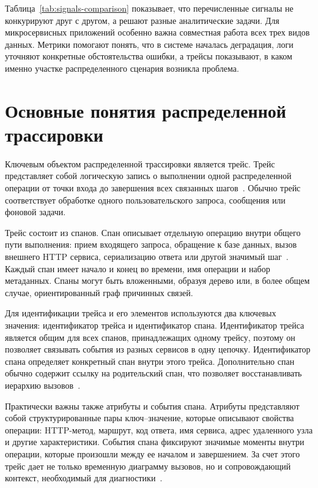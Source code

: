 Таблица~\ref{tab:signals-comparison} показывает, что перечисленные сигналы не
конкурируют друг с другом, а решают разные аналитические задачи. Для
микросервисных приложений особенно важна совместная работа всех трех видов данных.
Метрики помогают понять, что в системе началась деградация, логи уточняют
конкретные обстоятельства ошибки, а трейсы показывают, в каком именно участке
распределенного сценария возникла проблема.

\section{Основные понятия распределенной трассировки}

Ключевым объектом распределенной трассировки является трейс. Трейс представляет
собой логическую запись о выполнении одной распределенной операции от точки входа
до завершения всех связанных шагов~\cite{otelOverview,otelSdkTrace}. Обычно трейс
соответствует обработке одного пользовательского запроса, сообщения или фоновой
задачи.

Трейс состоит из спанов. Спан описывает отдельную операцию внутри общего пути
выполнения: прием входящего запроса, обращение к базе данных, вызов внешнего HTTP
сервиса, сериализацию ответа или другой значимый шаг~\cite{otelSdkSpan}. Каждый
спан имеет начало и конец во времени, имя операции и набор метаданных. Спаны
могут быть вложенными, образуя дерево или, в более общем случае, ориентированный
граф причинных связей.

Для идентификации трейса и его элементов используются два ключевых значения:
идентификатор трейса и идентификатор спана. Идентификатор трейса является общим
для всех спанов, принадлежащих одному трейсу, поэтому он позволяет связывать
события из разных сервисов в одну цепочку. Идентификатор спана определяет
конкретный спан внутри этого трейса. Дополнительно спан обычно содержит ссылку на
родительский спан, что позволяет восстанавливать иерархию вызовов~\cite{w3cTraceContext,otelTraceApi}.

Практически важны также атрибуты и события спана. Атрибуты представляют собой
структурированные пары ключ--значение, которые описывают свойства операции:
HTTP-метод, маршрут, код ответа, имя сервиса, адрес удаленного узла и другие
характеристики. События спана фиксируют значимые моменты внутри операции, которые
произошли между ее началом и завершением. За счет этого трейс дает не только
временную диаграмму вызовов, но и сопровождающий контекст, необходимый для
диагностики~\cite{otelOverview,otelTraceApi}.

